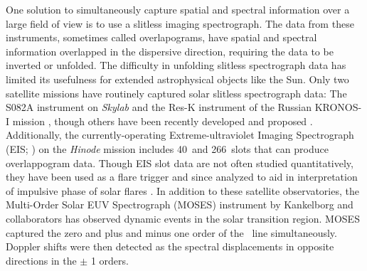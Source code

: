     One solution to simultaneously capture spatial and spectral information over a large field of view is to use a slitless imaging spectrograph.  
    The data from these instruments, sometimes called overlapograms, have spatial and spectral information overlapped in the dispersive direction, requiring the data to be inverted or unfolded.
    The difficulty in unfolding slitless spectrograph data has limited its usefulness for extended astrophysical objects like the Sun. 
    Only two satellite missions have routinely captured solar slitless spectrograph data: The S082A instrument on {\it Skylab} \citep{Tousey1973} and the Res-K instrument of the Russian KRONOS-I mission \citep{Zhitnik1998}, though others have been recently developed and proposed \citep{winebarger2019,golub2020}. 
    Additionally, the currently-operating Extreme-ultraviolet Imaging Spectrograph (EIS; \citet{culhane2007}) on the {\it Hinode} mission \citep{kosugi2007} includes 40\arcsec\ and 266\arcsec\ slots that can produce overlappogram data.  
    Though EIS slot data are not often studied quantitatively, %
    they have been used as a flare trigger and since analyzed to aid in interpretation of impulsive phase of solar flares \citep{harra2017,harra2020}.
    In addition to these satellite observatories, %
    the Multi-Order Solar EUV Spectrograph (MOSES) instrument by Kankelborg and collaborators \citep{Kankelborg01,Fox10,Rust2019} has observed dynamic events in the solar transition region.
    MOSES captured the zero and plus and minus one order of the \heii \ line simultaneously. 
    Doppler shifts were then detected as the spectral displacements in opposite directions in the $\pm$ 1 orders.
    
